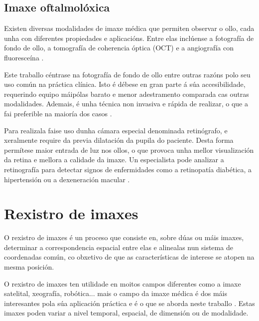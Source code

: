 \subsection{Imaxe oftalmolóxica}
\label{subsec:Imaxe oftalmolóxica}
Existen diversas modalidades de imaxe médica que permiten observar o ollo, cada unha con diferentes propiedades e aplicacións. 
Entre elas inclúense a fotografía de fondo de ollo, a tomografía de coherencia óptica (OCT) e a angiografía con fluoresceína \cite{ilginis2014ophthalmic}.

Este traballo céntrase na fotografía de fondo de ollo entre outras razóns polo seu uso común na práctica clínica.
Isto é débese en gran parte á súa accesibilidade, requerindo equipo máipólas barato e menor adestramento comparada cas outras modalidades. 
Ademais, é unha técnica non invasiva e rápida de realizar, o que a fai preferible na maioría dos casos \cite{retinimaging}.

Para realizala faise uso dunha cámara especial denominada retinógrafo, e xeralmente require da previa dilatación da pupila do paciente.
Desta forma permítese maior entrada de luz nos ollos, o que provoca unha mellor visualización da retina e mellora a calidade da imaxe.
Un especialista pode analizar a retinografía para detectar signos de enfermidades como a retinopatía diabética, a hipertensión ou a dexeneración macular \cite{retreggood}.

\section{Rexistro de imaxes}
\label{sec:Rexistro de imaxes}
O rexistro de imaxes é un proceso que consiste en, sobre dúas ou máis imaxes, determinar a correspondencia espacial entre elas
 e alinealas nun sistema de coordenadas común, co obxetivo de que as características de interese se atopen na mesma posición.


O rexistro de imaxes ten utilidade en moitos campos diferentes como a imaxe satelital, xeografía, robótica... mais o 
campo da imaxe médica é dos máis interesantes pola súa aplicación práctica e é o que se aborda neste traballo \cite{goshtasby2017theory}.
Estas imaxes poden variar a nivel temporal, espacial, de dimensión ou de modalidade.

